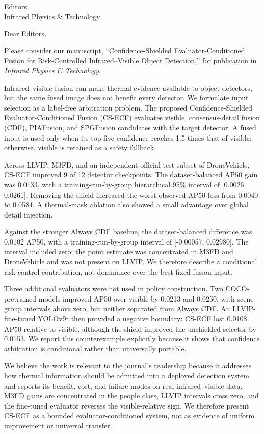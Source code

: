 \documentclass[a4paper,10pt]{letter}
\begin{document}
\sloppy
\begin{letter}{Editors\\Infrared Physics \& Technology}
\opening{Dear Editors,}

Please consider our manuscript, ``Confidence-Shielded
Evaluator-Conditioned Fusion for Risk-Controlled Infrared--Visible Object
Detection,'' for publication in \emph{Infrared Physics \& Technology}.

Infrared--visible fusion can make thermal evidence available to object
detectors, but the same fused image does not benefit every detector. We
formulate input selection as a label-free arbitration problem. The proposed
Confidence-Shielded Evaluator-Conditioned Fusion (CS-ECF) evaluates visible,
consensus-detail fusion (CDF), PIAFusion, and SPGFusion candidates with the
target detector. A fused input is used only when its top-five confidence reaches
1.5 times that of visible; otherwise, visible is retained as a safety fallback.

Across LLVIP, M3FD, and an independent official-test subset of DroneVehicle,
CS-ECF improved 9 of 12 detector checkpoints. The dataset-balanced AP50 gain was
0.0133, with a training-run-by-group hierarchical 95\% interval of [0.0026, 0.0261].
Removing the shield increased the worst observed AP50 loss from 0.0040 to
0.0584. A thermal-mask ablation also showed a small advantage over global
detail injection.

Against the stronger Always CDF baseline, the dataset-balanced difference was
0.0102 AP50, with a training-run-by-group interval of [-0.00057, 0.02980].
The interval included zero; the point estimate was concentrated in M3FD and
DroneVehicle and was not present on LLVIP. We therefore describe a
conditional risk-control contribution, not dominance over the best fixed fusion
input.

Three additional evaluators were not used in policy construction. Two
COCO-pretrained models improved AP50 over visible by 0.0213 and 0.0250, with
scene-group intervals above zero, but neither separated from Always CDF. An
LLVIP-fine-tuned YOLOv9t then provided a negative boundary: CS-ECF lost 0.0108
AP50 relative to visible, although the shield improved the unshielded selector
by 0.0153. We report this counterexample explicitly because it shows that
confidence arbitration is conditional rather than universally portable.

We believe the work is relevant to the journal's readership because it addresses
how thermal information should be admitted into a deployed detection system and
reports its benefit, cost, and failure modes on real infrared--visible data.
M3FD gains are concentrated in the people class, LLVIP intervals cross zero,
and the fine-tuned evaluator reverses the visible-relative sign. We therefore
present CS-ECF as a bounded evaluator-conditioned system, not as evidence of
uniform improvement or universal transfer.


\end{letter}
\end{document}
